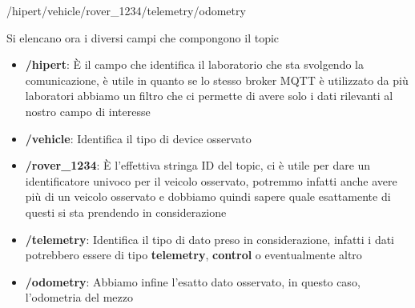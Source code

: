 \begin{center}
  /hipert/vehicle/rover\_1234/telemetry/odometry
\end{center}

\noindent Si elencano ora i diversi campi che compongono il topic

\begin{itemize}
  \item \textbf{/hipert}: È il campo che identifica il laboratorio che sta svolgendo la comunicazione, è utile in quanto se lo stesso broker MQTT è utilizzato da più laboratori abbiamo un filtro che ci permette di avere solo i dati rilevanti al nostro campo di interesse
  \item \textbf{/vehicle}: Identifica il tipo di device osservato
  \item \textbf{/rover\_1234}: È l'effettiva stringa ID del topic, ci è utile per dare un identificatore univoco per il veicolo osservato, potremmo infatti anche avere più di un veicolo osservato e dobbiamo quindi sapere quale esattamente di questi si sta prendendo in considerazione
  \item \textbf{/telemetry}: Identifica il tipo di dato preso in considerazione, infatti i dati potrebbero essere di tipo \textbf{telemetry}, \textbf{control} o eventualmente altro
  \item \textbf{/odometry}: Abbiamo infine l'esatto dato osservato, in questo caso, l'odometria del mezzo
\end{itemize}

